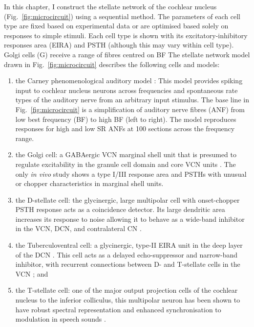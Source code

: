\medskip{}

In this chapter, I construct the stellate network of the cochlear
nucleus (Fig.~\ref{fig:microcircuit}) using a sequential method.  The parameters of each cell type
are fixed based on experimental data or are optimised based solely on
responses to simple stimuli.  Each cell type is shown with its excitatory-inhibitory responses area (EIRA) and PSTH (although this may vary within cell type). Golgi cells (G) receive a range of fibres centred on BF
The stellate network model drawn in Fig.~\ref{fig:microcircuit} describes the following
cells and models:
\begin{enumerate}
\item the Carney phenomenological auditory model
  \citet{ZilanyBruceEtAl:2009}: This model provides spiking input to
  cochlear nucleus neurons across frequencies and spontaneous rate
  types of the auditory nerve from an arbitrary input stimulus. The
  base line in Fig.~\ref{fig:microcircuit} is a simplification of
  auditory nerve fibres (ANF) from low best frequency (BF) to high BF
  (left to right). The model reproduces responses for high and low SR
  ANFs at 100 sections across the frequency range.
\item the Golgi cell: a GABAergic VCN marginal shell unit that is
  presumed to regulate excitability in the granule cell domain and
  core VCN units \citep{FerragamoGoldingEtAl:1998}. The only \emph{in vivo} study shows a type I/III response area and PSTHs with unusual or chopper characteristics in marginal shell units\citep{GhoshalKim:1997}. 
\item the D-stellate cell: the glycinergic, large multipolar cell with
  onset-chopper PSTH response acts as a coincidence detector. Its
  large dendritic area increases its response to noise allowing it to
  behave as a wide-band inhibitor in the VCN, DCN, and contralateral CN 
  \citep{SmithMassieEtAl:2005,ArnottWallaceEtAl:2004,NeedhamPaolini:2007}.
\item the Tuberculoventral cell: a glycinergic, type-II EIRA unit in
  the deep layer of the DCN \citep{SpirouDavisEtAl:1999}.  This cell acts as a delayed
  echo-suppressor and narrow-band inhibitor, with recurrent
  connections between D- and T-stellate cells in the VCN \citep{Alibardi:2006,OertelWickesberg:1993,WickesbergWhitlonEtAl:1991}; and 
\item the T-stellate cell: one of the major output projection cells of
  the cochlear nucleus to the inferior colliculus, this multipolar
  neuron has been shown to have robust spectral representation and
  enhanced synchronisation to modulation in speech sounds \citep{BlackburnSachs:1990,KeilsonRichardsEtAl:1997}.
\end{enumerate}

